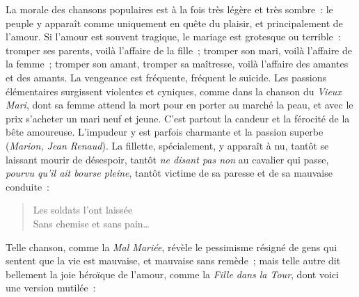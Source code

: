 \documentclass[french,twoside]{book} %
\begin{document}
\noindent La morale des chansons populaires est à la fois très légère et très sombre : le peuple y apparaît comme uniquement en quête du plaisir, et principalement de l’amour. Si l’amour est souvent tragique, le mariage est grotesque ou terrible : tromper ses parents, voilà l’affaire de la fille ; tromper son mari, voilà l’affaire de la femme ; tromper son amant, tromper sa maîtresse, voilà l’affaire des amantes et des amants. La vengeance est fréquente, fréquent le suicide. Les passions élémentaires surgissent violentes et cyniques, comme dans la chanson du {\itshape Vieux Mari}, dont sa femme attend la mort pour en porter au marché la peau, et avec le prix s’acheter un mari neuf et jeune. C’est partout la candeur et la férocité de la bête amoureuse. L’impudeur y est parfois charmante et la passion superbe ({\itshape Marion, Jean Renaud}). La fillette, spécialement, y apparaît à nu, tantôt se laissant mourir de désespoir, tantôt {\itshape ne disant pas non} au cavalier qui passe, {\itshape pourvu qu’il ait bourse pleine}, tantôt victime de sa paresse et de sa mauvaise conduite :\par


\begin{verse}
Les soldats l’ont laissée\\
Sans chemise et sans pain…\\
\end{verse}

\noindent Telle chanson, comme la {\itshape Mal Mariée}, révèle le pessimisme résigné de gens qui sentent que la vie est mauvaise, et mauvaise sans remède ; mais telle autre dit bellement la joie héroïque de l’amour, comme la {\itshape Fille dans la Tour}, dont voici une version mutilée :\par
\end{document}
